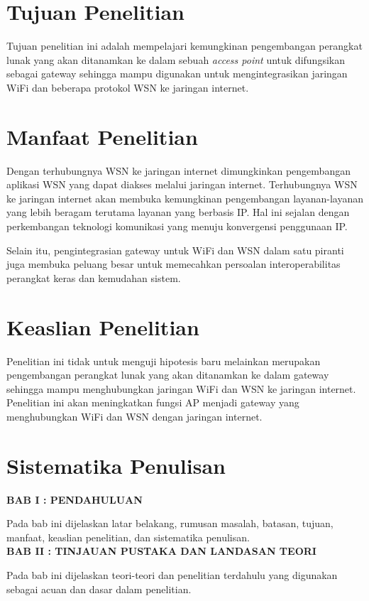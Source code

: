 \section{Tujuan Penelitian}
Tujuan penelitian ini adalah mempelajari kemungkinan pengembangan perangkat lunak yang akan ditanamkan ke dalam sebuah \emph{access point} untuk difungsikan sebagai gateway sehingga mampu digunakan untuk mengintegrasikan jaringan WiFi dan beberapa protokol WSN ke jaringan internet.


\section{Manfaat Penelitian}
Dengan terhubungnya WSN ke jaringan internet dimungkinkan pengembangan aplikasi WSN yang dapat diakses melalui jaringan internet. Terhubungnya WSN ke jaringan internet akan membuka kemungkinan pengembangan layanan-layanan yang lebih beragam terutama layanan yang berbasis IP. Hal ini sejalan dengan perkembangan teknologi komunikasi yang menuju konvergensi penggunaan IP.

Selain itu, pengintegrasian gateway untuk WiFi dan WSN dalam satu piranti juga membuka peluang besar untuk memecahkan persoalan interoperabilitas perangkat keras dan kemudahan sistem.


\section{Keaslian Penelitian}
Penelitian ini tidak untuk menguji hipotesis baru melainkan merupakan pengembangan perangkat lunak yang akan ditanamkan ke dalam gateway sehingga mampu menghubungkan jaringan WiFi dan WSN ke jaringan internet. Penelitian ini akan meningkatkan fungsi AP menjadi gateway yang menghubungkan WiFi dan WSN dengan jaringan internet.


\section{Sistematika Penulisan}
\noindent
\textbf{BAB I : PENDAHULUAN}

Pada bab ini dijelaskan latar belakang, rumusan masalah, batasan, tujuan, manfaat, keaslian penelitian, dan sistematika penulisan.\\

\noindent
\textbf{BAB II : TINJAUAN PUSTAKA DAN LANDASAN TEORI}

Pada bab ini dijelaskan teori-teori dan penelitian terdahulu yang digunakan sebagai acuan dan dasar dalam penelitian.\\

